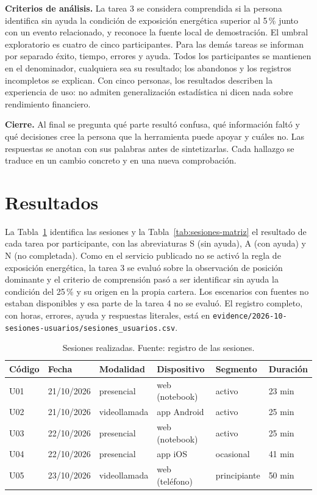 \textbf{Criterios de análisis.} La tarea 3 se considera comprendida si la persona identifica sin ayuda la condición de exposición energética superior al 5\,\% junto con un evento relacionado, y reconoce la fuente local de demostración. El umbral exploratorio es cuatro de cinco participantes. Para las demás tareas se informan por separado éxito, tiempo, errores y ayuda. Todos los participantes se mantienen en el denominador, cualquiera sea su resultado; los abandonos y los registros incompletos se explican. Con cinco personas, los resultados describen la experiencia de uso: no admiten generalización estadística ni dicen nada sobre rendimiento financiero.

\textbf{Cierre.} Al final se pregunta qué parte resultó confusa, qué información faltó y qué decisiones cree la persona que la herramienta puede apoyar y cuáles no. Las respuestas se anotan con sus palabras antes de sintetizarlas. Cada hallazgo se traduce en un cambio concreto y en una nueva comprobación.

\section*{Resultados}
La Tabla~\ref{tab:sesiones-participantes} identifica las sesiones y la Tabla~\ref{tab:sesiones-matriz} el resultado de cada tarea por participante, con las abreviaturas S (sin ayuda), A (con ayuda) y N (no completada). Como en el servicio publicado no se activó la regla de exposición energética, la tarea 3 se evaluó sobre la observación de posición dominante y el criterio de comprensión pasó a ser identificar sin ayuda la condición del 25\,\% y su origen en la propia cartera. Los escenarios con fuentes no estaban disponibles y esa parte de la tarea 4 no se evaluó. El registro completo, con horas, errores, ayuda y respuestas literales, está en \texttt{evidence/2026-10-sesiones-usuarios/sesiones\_usuarios.csv}.

\begin{table}[ht]
\centering\small\renewcommand{\arraystretch}{1.15}
\caption{Sesiones realizadas. Fuente: registro de las sesiones.}\label{tab:sesiones-participantes}
\begin{tabular}{llllll}\hline
\textbf{Código} & \textbf{Fecha} & \textbf{Modalidad} & \textbf{Dispositivo} & \textbf{Segmento} & \textbf{Duración}\\\hline
U01 & 21/10/2026 & presencial & web (notebook) & activo & 23 min\\
U02 & 21/10/2026 & videollamada & app Android & activo & 25 min\\
U03 & 22/10/2026 & presencial & web (notebook) & activo & 25 min\\
U04 & 22/10/2026 & presencial & app iOS & ocasional & 41 min\\
U05 & 23/10/2026 & videollamada & web (teléfono) & principiante & 50 min\\\hline
\end{tabular}
\end{table}

